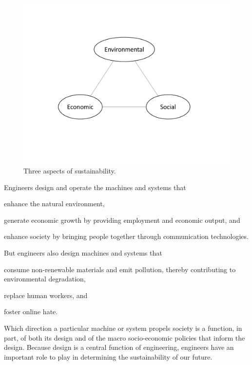 \documentclass[12pt]{article}
\begin{document}
\begin{figure}
\centering
\includegraphics[width=0.75\linewidth]{figure_other/TriangleDiagram.pdf}
\caption{Three aspects of sustainability.}
\label{fig:3_sustain}
\end{figure}

Engineers design and operate the machines and systems that
%
\begin{enumerate*}[label={(\alph*)}]

  \item enhance the natural environment,

  \item generate economic growth by providing employment and economic output, and

  \item enhance society by bringing people together through communication technologies.

\end{enumerate*}
%
But engineers also design machines and systems that
%
\begin{enumerate*}[label={(\alph*)}]

  \item consume non-renewable materials and
        emit pollution, thereby contributing to environmental degradation,

  \item replace human workers, and

  \item foster online hate.        

\end{enumerate*}
%
Which direction a particular machine or system propels society is a function, in part,
of both its design and of the macro socio-economic policies that inform the design.
Because design is a central function of engineering, 
engineers have an important role to play in determining 
the sustainability of our future. 
\end{document}
